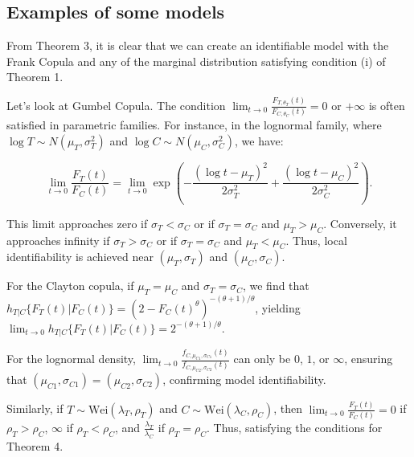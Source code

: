 \subsection{Examples of some models}

From Theorem 3, it is clear that we can create an identifiable model with the Frank Copula and any of the marginal distribution satisfying condition (i) of Theorem 1.

Let's look at Gumbel Copula. The condition \(\lim_{t \to 0} \frac{F_{T, \theta_T}(t)}{F_{C, \theta_C}(t)} = 0\) or \(+\infty\) is often satisfied in parametric families. For instance, in the lognormal family, where \(\log T \sim N(\mu_T, \sigma_T^2)\) and \(\log C \sim N(\mu_C, \sigma_C^2)\), we have:

\[
\lim_{t \to 0} \frac{F_T(t)}{F_C(t)} = \lim_{t \to 0} \exp \left( -\frac{(\log t - \mu_T)^2}{2 \sigma_T^2} + \frac{(\log t - \mu_C)^2}{2 \sigma_C^2} \right).
\]

This limit approaches zero if \(\sigma_T < \sigma_C\) or if \(\sigma_T = \sigma_C\) and \(\mu_T > \mu_C\). Conversely, it approaches infinity if \(\sigma_T > \sigma_C\) or if \(\sigma_T = \sigma_C\) and \(\mu_T < \mu_C\). Thus, local identifiability is achieved near \((\mu_T, \sigma_T)\) and \((\mu_C, \sigma_C)\). 

For the Clayton copula, if \(\mu_T = \mu_C\) and \(\sigma_T = \sigma_C\), we find that \( h_{T|C} \{F_T(t) | F_C(t)\} = (2 - F_C(t)^\theta)^{-(\theta+1)/\theta}\), yielding \(\lim_{t \to 0} h_{T|C} \{F_T(t) | F_C(t)\} = 2^{-(\theta+1)/\theta}\).

For the lognormal density, \(\lim_{t \to 0} \frac{f_{C, \mu_{C1}, \sigma_{C1}}(t)}{f_{C, \mu_{C2}, \sigma_{C2}}(t)}\) can only be \(0\), \(1\), or \(\infty\), ensuring that \((\mu_{C1}, \sigma_{C1}) = (\mu_{C2}, \sigma_{C2})\), confirming model identifiability. 

Similarly, if \(T \sim \text{Wei}(\lambda_T, \rho_T)\) and \(C \sim \text{Wei}(\lambda_C, \rho_C)\), then \(\lim_{t \to 0} \frac{F_T(t)}{F_C(t)} = 0\) if \(\rho_T > \rho_C\), \(\infty\) if \(\rho_T < \rho_C\), and \(\frac{\lambda_T}{\lambda_C}\) if \(\rho_T = \rho_C\).
Thus, satisfying the conditions for Theorem 4.